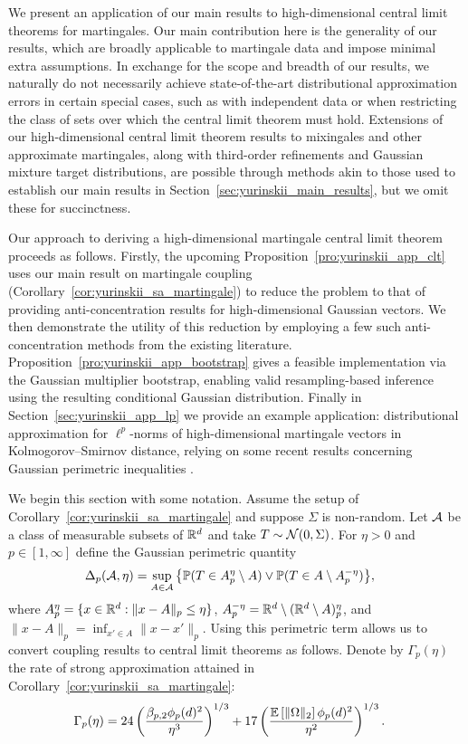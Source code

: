 We present an application of our main results to
high-dimensional central limit theorems for martingales. Our main
contribution here is the generality of our results, which are broadly
applicable to martingale data and impose minimal extra assumptions. In exchange
for the scope and breadth of our results, we naturally do not necessarily
achieve state-of-the-art distributional approximation errors in certain special
cases, such as with independent data or when restricting the class of sets over
which the central limit theorem must hold. Extensions of our high-dimensional
central limit theorem results to mixingales and other approximate martingales,
along with third-order refinements and Gaussian mixture target distributions,
are possible through methods akin to those used to establish our main results
in Section~\ref{sec:yurinskii_main_results}, but we omit these for succinctness.

Our approach to deriving a high-dimensional martingale central limit theorem
proceeds as follows. Firstly, the upcoming
Proposition~\ref{pro:yurinskii_app_clt} uses our
main result on martingale coupling
(Corollary~\ref{cor:yurinskii_sa_martingale}) to
reduce the problem to that of providing anti-concentration results for
high-dimensional Gaussian vectors. We then demonstrate the utility of this
reduction by employing a few such anti-concentration methods from the existing
literature. Proposition~\ref{pro:yurinskii_app_bootstrap} gives a feasible
implementation via
the Gaussian multiplier bootstrap, enabling valid
resampling-based inference using
the resulting conditional Gaussian distribution. Finally in
Section~\ref{sec:yurinskii_app_lp} we provide an example application:
distributional
approximation for $\ell^p$-norms of high-dimensional martingale vectors
in Kolmogorov--Smirnov distance, relying on some recent results
concerning Gaussian perimetric inequalities
\citep{nazarov2003maximal,kozbur2021dimension,
giessing2023anti,chernozhukov2017detailed}.

We begin this section with some notation. Assume the setup of
Corollary~\ref{cor:yurinskii_sa_martingale} and suppose $\Sigma$ is
non-random. Let $\mathcal{A}$ be a class of measurable subsets of
$\mathbb{R}^d$ and take $T \sim \mathcal{N}(0, \Sigma)$.
For $\eta>0$ and $p \in [1, \infty]$ define the Gaussian perimetric quantity
%
\begin{align*}
  \Delta_p(\mathcal{A}, \eta)
  &=
  \sup_{A\in \mathcal{A}}
  \big\{\mathbb{P}(T\in A_p^\eta\setminus A)
  \vee \mathbb{P}(T\in A \setminus A_p^{-\eta})\big\},
\end{align*}
%
where $A_p^\eta = \{x \in \mathbb{R}^d : \|x - A\|_p \leq \eta\}$,
$A_p^{-\eta} = \mathbb{R}^d \setminus (\mathbb{R}^d \setminus A)_p^\eta$,
and $\|x - A\|_p = \inf_{x' \in A} \|x - x'\|_p$.
Using this perimetric term allows us to convert coupling results
to central limit theorems as follows.
Denote by $\Gamma_p(\eta)$ the rate of strong approximation attained in
Corollary~\ref{cor:yurinskii_sa_martingale}:
%
\begin{align*}
  \Gamma_p(\eta)
  &=
  24 \left(
    \frac{\beta_{p,2} \phi_p(d)^2}{\eta^3}
  \right)^{1/3}
  + 17 \left(
    \frac{\mathbb{E} \left[ \|\Omega\|_2 \right] \phi_p(d)^2}{\eta^2}
  \right)^{1/3}.
\end{align*}

